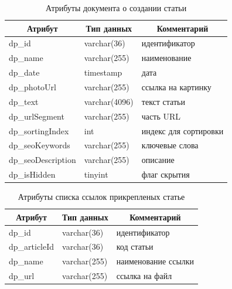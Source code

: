 \begin{table}[!htb]
    \centering\small

    \caption{Атрибуты документа о создании статьи}
    \label{tab:DP_DOC_Articles}

    \begin{tabular}{|p{5cm}|p{2.5cm}|p{9cm}|}
        \hline
        \multicolumn{1}{|c|}{Атрибут}
        & \multicolumn{1}{c|}{Тип данных}
        & \multicolumn{1}{c|}{Комментарий}
        \\ \hline

        dp\_id & varchar(36) & идентификатор \\ \hline
        dp\_name & varchar(255) & наименование \\ \hline
        dp\_date & timestamp & дата \\ \hline
        dp\_photoUrl & varchar(255) & ссылка на картинку \\ \hline
        dp\_text & varchar(4096) & текст статьи \\ \hline
        dp\_urlSegment & varchar(255) & часть URL \\ \hline
        dp\_sortingIndex & int & индекс для сортировки \\ \hline
        dp\_seoKeywords & varchar(255) & ключевые слова \\ \hline
        dp\_seoDescription & varchar(255) & описание \\ \hline
        dp\_isHidden & tinyint & флаг скрытия \\ \hline
    \end{tabular}
\end{table}

\begin{table}[!htb]
    \centering\small

    \caption{Атрибуты списка ссылок прикрепленых статье}
    \label{tab:DP_LST_ArticleAttachedLinks}

    \begin{tabular}{|p{5cm}|p{2.5cm}|p{9cm}|}
        \hline
        \multicolumn{1}{|c|}{Атрибут}
        & \multicolumn{1}{c|}{Тип данных}
        & \multicolumn{1}{c|}{Комментарий}
        \\ \hline

        dp\_id & varchar(36) & идентификатор \\ \hline
        dp\_articleId & varchar(36) & код статьи \\ \hline
        dp\_name & varchar(255) & наименование ссылки \\ \hline
        dp\_url & varchar(255) & ссылка на файл \\ \hline
    \end{tabular}
\end{table}

